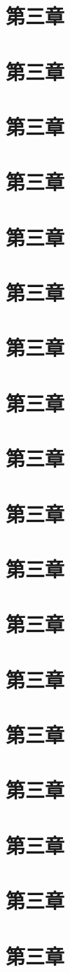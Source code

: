 \documentclass{bookthemeMono}
\begin{document}
\chapter{第三章}
\chapter{第三章}
\chapter{第三章}
\chapter{第三章}
\chapter{第三章}
\chapter{第三章}
\chapter{第三章}
\chapter{第三章}
\chapter{第三章}
\chapter{第三章}
\chapter{第三章}
\chapter{第三章}
\chapter{第三章}
\chapter{第三章}
\chapter{第三章}
\chapter{第三章}
\chapter{第三章}
\chapter{第三章}
\end{document}
